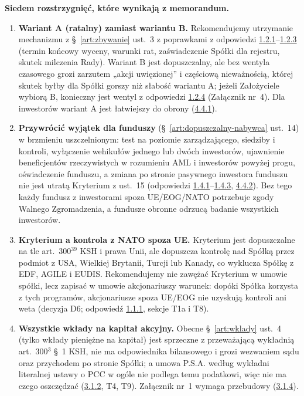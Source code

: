 \documentclass[12pt,a4paper]{report}
\begin{document}
\textbf{Siedem rozstrzygnięć, które wynikają z memorandum.}
\begin{enumerate}
  \item \textbf{Wariant A (ratalny) zamiast wariantu B.} Rekomendujemy utrzymanie mechanizmu z §~\ref{art:zbywanie} ust.~3 z poprawkami z odpowiedzi \hyperref[memo:1.2.1]{1.2.1}--\hyperref[memo:1.2.3]{1.2.3} (termin końcowy wyceny, warunki rat, zaświadczenie Spółki dla rejestru, skutek milczenia Rady). Wariant B jest dopuszczalny, ale bez wentyla czasowego grozi zarzutem „akcji uwięzionej” i częściową nieważnością, której skutek byłby dla Spółki gorszy niż słabość wariantu A; jeżeli Założyciele wybiorą B, konieczny jest wentyl z odpowiedzi \hyperref[memo:1.2.4]{1.2.4} (Załącznik nr~4). Dla inwestorów wariant A jest łatwiejszy do obrony (\hyperref[memo:4.4.1]{4.4.1}).
  \item \textbf{Przywrócić wyjątek dla funduszy} (§~\ref{art:dopuszczalny-nabywca} ust.~14) w brzmieniu uszczelnionym: test na poziomie zarządzającego, siedziby i kontroli, wyłączenie wehikułów jednego lub dwóch inwestorów, ujawnienie beneficjentów rzeczywistych w rozumieniu AML i inwestorów powyżej progu, oświadczenie funduszu, a zmiana po stronie pasywnego inwestora funduszu nie jest utratą Kryterium z ust.~15 (odpowiedzi \hyperref[memo:1.4.1]{1.4.1}--\hyperref[memo:1.4.3]{1.4.3}, \hyperref[memo:4.4.2]{4.4.2}). Bez tego każdy fundusz z inwestorami spoza UE/EOG/NATO potrzebuje zgody Walnego Zgromadzenia, a fundusze obronne odrzucą badanie wszystkich inwestorów.
  \item \textbf{Kryterium a kontrola z NATO spoza UE.} Kryterium jest dopuszczalne na tle art.~300$^{39}$ KSH i prawa Unii, ale dopuszcza kontrolę nad Spółką przez podmiot z USA, Wielkiej Brytanii, Turcji lub Kanady, co wyklucza Spółkę z EDF, AGILE i EUDIS. Rekomendujemy nie zawężać Kryterium w umowie spółki, lecz zapisać w umowie akcjonariuszy warunek: dopóki Spółka korzysta z tych programów, akcjonariusze spoza UE/EOG nie uzyskują kontroli ani weta (decyzja D6; odpowiedź \hyperref[memo:1.1.1]{1.1.1}, sekcje T1a i T8).
  \item \textbf{Wszystkie wkłady na kapitał akcyjny.} Obecne §~\ref{art:wklady} ust.~4 (tylko wkłady pieniężne na kapitał) jest sprzeczne z przeważającą wykładnią art.~300$^{3}$ §~1 KSH, nie ma odpowiednika bilansowego i grozi wezwaniem sądu oraz przychodem po stronie Spółki; a umowa P.S.A. według wykładni literalnej ustawy o PCC w ogóle nie podlega temu podatkowi, więc nie ma czego oszczędzać (\hyperref[memo:3.1.2]{3.1.2}, T4, T9). Załącznik nr~1 wymaga przebudowy (\hyperref[memo:3.1.4]{3.1.4}).

\end{enumerate}
\end{document}
